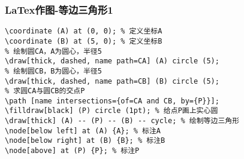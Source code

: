 \begin{frame}[fragile]
\frametitle{LaTex作图-等边三角形1}

\begin{lstlisting}
\coordinate (A) at (0, 0); % 定义坐标A
\coordinate (B) at (5, 0); % 定义坐标B
% 绘制圆CA，A为圆心，半径5
\draw[thick, dashed, name path=CA] (A) circle (5); 
% 绘制圆CB，B为圆心，半径5
\draw[thick, dashed, name path=CB] (B) circle (5); 
% 求圆CA与圆CB的交点P
\path [name intersections={of=CA and CB, by={P}}]; 
\filldraw[black] (P) circle (1pt); % 给点P画上实心圆
\draw[thick] (A) -- (P) -- (B) -- cycle; % 绘制等边三角形
\node[below left] at (A) {A}; % 标注A
\node[below right] at (B) {B}; % 标注B
\node[above] at (P) {P}; % 标注P
\end{lstlisting}
\end{frame}
